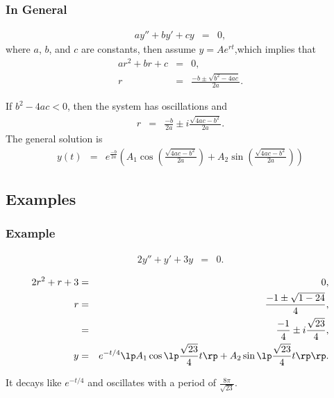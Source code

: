 \begin{frame}
  \frametitle{In General}

  \begin{eqnarray*}
    a y'' + by' + cy & = & 0,
  \end{eqnarray*}
  where $a$, $b$, and $c$ are constants, then assume
  $ y  =  A e^{rt}$,which implies that
  \begin{eqnarray*}
    a r^2 + b r + c & = & 0, \\
    r & = & \frac{-b\pm\sqrt{b^2-4ac}}{2a}.
  \end{eqnarray*}

  If $b^2-4ac  < 0$, 
  then the system has oscillations and
  \begin{eqnarray*}
    r & = & \frac{-b}{2a} \pm i \frac{\sqrt{4ac-b^2}}{2a}.
  \end{eqnarray*}
   The general solution is 
  \begin{eqnarray*}
    y(t) & = & e^{\frac{-b}{2a}} \left(
           A_1 \cos\left(\frac{\sqrt{4ac-b^2}}{2a}\right)
           +A_2 \sin\left(\frac{\sqrt{4ac-b^2}}{2a}\right)
           \right) 
  \end{eqnarray*}
 
\end{frame}

\subsection{Examples}

\begin{frame}
  \frametitle{Example}

  \begin{eqnarray*}
    2y'' + y' + 3y & = & 0.
  \end{eqnarray*}
  
  {
    \begin{eqnarray*}
      2r^2+r+3 & = & 0, \\
      r & = & \frac{-1\pm\sqrt{1-24}}{4}, \\
      & = & \frac{-1}{4} \pm i\frac{\sqrt{23}}{4}, \\
      y & = & e^{-t/4} 
      \lp A_1 \cos\lp \frac{\sqrt{23}}{4} t \rp + A_2 \sin\lp \frac{\sqrt{23}}{4} t \rp \rp.
    \end{eqnarray*}

    It decays like $e^{-t/4}$ and oscillates with a period of $\frac{8\pi}{\sqrt{23}}$.
  }

\end{frame}


